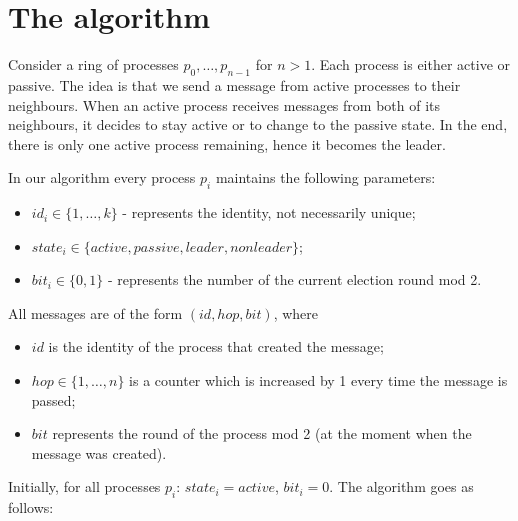 \documentclass[a4paper,12pt]{article}
\begin{document}
\section{The algorithm}
Consider a ring of processes $p_0, \ldots, p_{n-1}$ for $n > 1$. Each process is either active or passive. The idea is that we send a message from active processes to their neighbours. When an active process receives messages from both of its neighbours, it decides to stay active or to change to the passive state. In the end, there is only one active process remaining, hence it becomes the leader.\par
In our algorithm every process $p_i$ maintains the following parameters:
\begin{itemize}
    \itemsep0em 
    \item $id_i \in \{1, \ldots, k\}$ - represents the identity, not necessarily unique;
    \item $state_i \in \{active, passive, leader, nonleader\}$;
    \item $bit_i \in \{0,1\}$ - represents the number of the current election round mod 2.
\end{itemize}
All messages are of the form $(id, hop, bit)$, where
\begin{itemize}
    \itemsep0em 
    \item $id$ is the identity of the process that created the message;
    \item $hop \in \{1, \ldots, n\}$ is a counter which is increased by 1 every time the message is passed;
    \item $bit$ represents the round of the process mod 2 (at the moment when the message was created).
\end{itemize}
Initially, for all processes $p_i$: $state_i = active$, $bit_i = 0$. The algorithm goes as follows:
\end{document}
